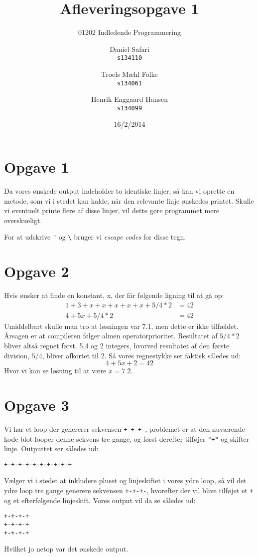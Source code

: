 \documentclass{scrartcl}
\begin{document}

\title{Afleveringsopgave 1}
\subtitle{01202 Indledende Programmering}
\author{
  Daniel Safari\\
  \texttt{s134110}
  \and
  Troels Mæhl Folke\\
  \texttt{s134061}
   \and
  Henrik Enggaard Hansen\\
  \texttt{s134099}
}
\date{16/2/2014}
\maketitle

\section*{Opgave 1}
Da vores ønskede output indeholder to identiske linjer, så kan vi oprette en metode, som vi i stedet kan kalde, når den relevante linje ønskedes printet. Skulle vi eventuelt printe flere af disse linjer, vil dette gøre programmet mere overskueligt.

For at udskrive \texttt{"} og \texttt{\textbackslash} bruger vi \emph{escape codes} for disse tegn.

\section*{Opgave 2}
Hvis ønsker at finde en konstant, x, der får følgende ligning til at gå op: 
\begin{align*}
1+3+x+x+x+x+x+5/4*2 & = 42 \\
         4+5x+5/4*2 & = 42
\end{align*}
Umiddelbart skulle man tro at løsningen var 7.1, men dette er ikke tilfældet. Årsagen er at compileren følger almen operatorprioritet. Resultatet af $5/4*2$ bliver altså regnet først. 5,4 og 2 integers, hvorved resultatet af den første division, $5/4$, bliver afkortet til 2. Så vores regnestykke ser faktisk således ud:
$$ 4+5x+2 = 42 $$
Hvor vi kan se løsning til at være $x=7.2$.


\section*{Opgave 3}
Vi har et loop der genererer sekvensen \texttt{+-+-+-}, problemet er at den nuværende kode blot looper denne sekvens tre gange, og først derefter tilføjer \texttt{"+"} og skifter linje. Outputtet ser således ud:
\begin{Verbatim}
+-+-+-+-+-+-+-+-+-+
\end{Verbatim}
Vælger vi i stedet at inkludere pluset og linjeskiftet i vores ydre loop, så vil det ydre loop tre gange generere sekvensen \texttt{+-+-+-}, hvorefter der vil blive tilføjet et \texttt{+} og et efterfølgende linjeskift.
Vores output vil da se således ud:
\begin{Verbatim}
+-+-+-+
+-+-+-+
+-+-+-+
\end{Verbatim}
Hvilket jo netop var det ønskede output.
\end{document}
